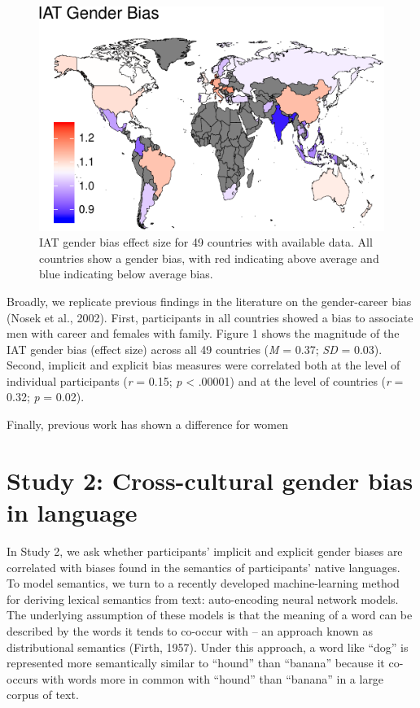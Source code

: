 \documentclass[10pt, letterpaper]{article}
\newenvironment{CodeChunk}{}{}
\begin{document}
\begin{CodeChunk}
\begin{figure}[t]

{\centering \includegraphics{figs/map-1} 

}

\caption[IAT gender bias effect size for 49 countries with available data]{IAT gender bias effect size for 49 countries with available data. All countries show a gender bias, with red indicating above average and blue indicating below average bias.}\label{fig:map}
\end{figure}
\end{CodeChunk}

Broadly, we replicate previous findings in the literature on the
gender-career bias (Nosek et al., 2002). First, participants in all
countries showed a bias to associate men with career and females with
family. Figure 1 shows the magnitude of the IAT gender bias (effect
size) across all 49 countries (\emph{M} = 0.37; \emph{SD} = 0.03).
Second, implicit and explicit bias measures were correlated both at the
level of individual participants (\emph{r} = 0.15; \emph{p} \textless{}
.00001) and at the level of countries (\emph{r} = 0.32; \emph{p} =
0.02).

Finally, previous work has shown a difference for women

\section{Study 2: Cross-cultural gender bias in
language}\label{study-2-cross-cultural-gender-bias-in-language}

In Study 2, we ask whether participants' implicit and explicit gender
biases are correlated with biases found in the semantics of
participants' native languages. To model semantics, we turn to a
recently developed machine-learning method for deriving lexical
semantics from text: auto-encoding neural network models. The underlying
assumption of these models is that the meaning of a word can be
described by the words it tends to co-occur with -- an approach known as
distributional semantics (Firth, 1957). Under this approach, a word like
``dog'' is represented more semantically similar to ``hound'' than
``banana'' because it co-occurs with words more in common with ``hound''
than ``banana'' in a large corpus of text.
\end{document}
